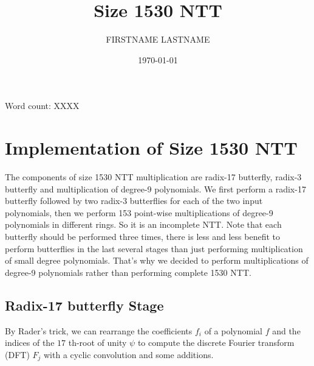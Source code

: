 \documentclass[11pt, a4paper]{article} %
\title{Size 1530 NTT} %
\author{
FIRSTNAME LASTNAME %
  }
\date{\small \today} %
\begin{document}
%

\maketitle %

\begin{center} %
    Word count: XXXX
\end{center}

\setcounter{page}{1} %

\section{Implementation of Size 1530 NTT} %
The components of size 1530 NTT multiplication are radix-17 butterfly, radix-3 butterfly and multiplication of degree-9 polynomials. We first perform a radix-17 butterfly followed by two radix-3 butterflies for each of the two input polynomials, then we perform 153 point-wise multiplications of degree-9 polynomials in different rings. So it is an incomplete NTT. Note that each butterfly should be performed three times, there is less and less benefit to perform butterflies in the last several stages than just performing multiplication of small degree polynomials. That's why we decided to perform multiplications of degree-9 polynomials rather than performing complete 1530 NTT.

\subsection{Radix-17 butterfly Stage} %

By Rader's trick, we can rearrange the coefficients $ f_i $ of a polynomial $ f $ and the indices of the $ 17 $ th-root of unity $ \psi $ to compute the discrete Fourier transform (DFT) $ F_j $ with a cyclic convolution and some additions.
\end{document}
